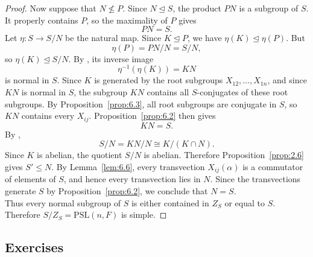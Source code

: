 \documentclass[../Odyssey_Project.tex]{subfiles}
\begin{document}
\begin{proof}
Now suppose that $N\nleq P$. Since $N\trianglelefteq S$, the product $PN$ is a subgroup of $S$. It properly contains $P$, so the maximality of $P$ gives
\[
    PN=S.
\]
Let $\eta\colon S\to S/N$ be the natural map. Since $K\trianglelefteq P$, we have $\eta(K)\trianglelefteq\eta(P)$. But
\[
    \eta(P)=PN/N=S/N,
\]
so $\eta(K)\trianglelefteq S/N$. By , its inverse image
\[
    \eta^{-1}(\eta(K))=KN
\]
is normal in $S$. Since $K$ is generated by the root subgroups $X_{12},\ldots,X_{1n}$, and since $KN$ is normal in $S$, the subgroup $KN$ contains all $S$-conjugates of these root subgroups. By Proposition~\ref{prop:6.3}, all root subgroups are conjugate in $S$, so $KN$ contains every $X_{ij}$. Proposition~\ref{prop:6.2} then gives
\[
    KN=S.
\]
By ,
\[
    S/N=KN/N\cong K/(K\cap N).
\]
Since $K$ is abelian, the quotient $S/N$ is abelian. Therefore Proposition~\ref{prop:2.6} gives $S'\leq N$. By Lemma~\ref{lem:6.6}, every transvection $X_{ij}(\alpha)$ is a commutator of elements of $S$, and hence every transvection lies in $N$. Since the transvections generate $S$ by Proposition~\ref{prop:6.2}, we conclude that $N=S$.\\
Thus every normal subgroup of $S$ is either contained in $Z_S$ or equal to $S$. Therefore $S/Z_S=\mathrm{PSL}(n,F)$ is simple.
\end{proof}

\subsection*{Exercises}
\end{document}
